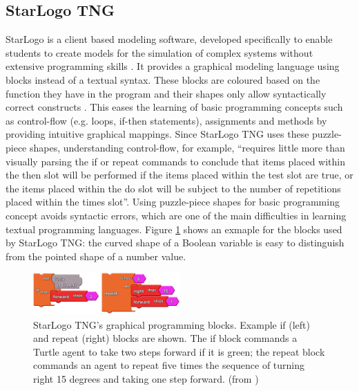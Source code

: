 \documentclass[runningheads,a4paper]{llncs}
\begin{document}
 \subsection{StarLogo TNG}
  StarLogo is a client based modeling software, developed specifically to enable students to 
  create models for the simulation of complex systems without extensive programming skills \cite{klopfer2009starlogo}.
  It provides a graphical modeling language using blocks instead of a textual syntax. 
  These blocks are coloured based on the function they have in the program and their shapes only allow syntactically correct constructs \cite{klopfer2009starlogo}.
  This eases the learning of basic programming concepts such as control-flow (e.g. loops, if-then statements),
  assignments and methods by providing intuitive graphical mappings. Since StarLogo TNG uses these puzzle-piece shapes, understanding 
  control-flow, for example, ``requires little more than visually parsing the if or repeat commands 
  to conclude that items placed within the then slot will be performed if the items placed within the 
  test slot are true, or the items placed within the do slot will be subject to the number of repetitions placed within the times slot''\cite{smith2011biology}.
  Using puzzle-piece shapes for basic programming concept avoids syntactic errors, 
  which are one of the main difficulties in learning textual programming languages.
  Figure \ref{fig1} shows an exmaple for the blocks used by StarLogo TNG: 
  the curved shape of a Boolean variable is easy to distinguish from the pointed shape of a number value.
  
  \begin{figure}[H]
	\centering
  \includegraphics[width=0.5\textwidth]{images/StarLogoTNGBlocksEx.PNG}
	\caption{ StarLogo TNG’s graphical programming blocks. Example if (left) and repeat (right) blocks are shown. The
	  if block commands a Turtle agent to take two steps forward if it is green; the repeat block commands an agent to
	  repeat five times the sequence of turning right 15 degrees and taking one step forward. (from \cite{smith2011biology})}
	\label{fig1}
  \end{figure}
  
\end{document}
